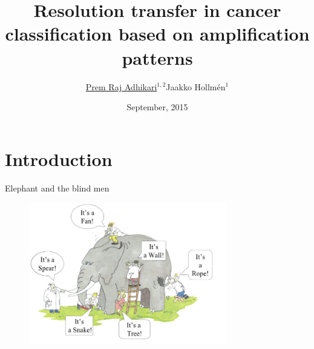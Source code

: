 \documentclass[utf8, a4paper]{beamer}
\title
  [Resolution transfer in cancer classification]
  {Resolution transfer in cancer classification based on amplification patterns}
\author
  [Prem Raj Adhikari]
  {\underline{Prem Raj Adhikari}$^{1,2}$\quad Jaakko Hollm\'en$^{1}$}
\date
  {September, 2015}
\institute
{ 
$^{1}$ Department Computer Science, Aalto University\\
$^{2}$ Department of Physiology, University of Turku\\
}
\begin{document}
\maketitle

% 
% 

\section
  {Introduction}


  
\begin{frame} {Elephant and the blind men} 

\vspace{-0.9cm}

\begin{figure}
\centering
  \includegraphics[trim={0cm 0.5cm 0cm 0cm},clip, width=0.77\textwidth]{images/elephant}
\end{figure}

\end{frame}
\end{document}

